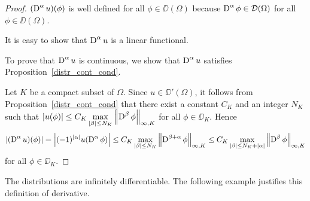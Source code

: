 \begin{proof}
 $\displaystyle (\operatorname{D}^\alpha u)(\phi)$ is well defined for all
$\phi \in \DD(\Omega)$ because $\displaystyle \operatorname{D}^\alpha \phi \in \mathcal{D}(\Omega)$
for all $\phi\in \DD(\Omega)$.

 It is easy to show that $\displaystyle \operatorname{D}^\alpha u$ is a
linear functional.

 To prove that $\displaystyle \operatorname{D}^\alpha u$ is
continuous, we show that $\displaystyle \operatorname{D}^\alpha u$ satisfies
Proposition~\ref{distr_cont_cond}.

Let $K$ be a compact subset of $\Omega$.  Since $u\in \DD'(\Omega)$,
it follows from Proposition~\ref{distr_cont_cond} that there exist a
constant $C_K$ and an integer $N_K$ such that
$\displaystyle \left| u(\phi) \right| \leq C_K \max_{|\beta|\leq N_K}
\left\| \operatorname{D}^\beta \phi \right\|_{\infty,K}$
for all $\phi \in \DD_K$.  Hence
\[
\left| (\operatorname{D}^\alpha u)(\phi) \right| =
  \left| (-1)^{|\alpha|} u(\operatorname{D}^\alpha \phi) \right|
\leq C_K \max_{|\beta|\leq N_K}
\left\| \operatorname{D}^{\beta+\alpha} \phi \right\|_{\infty,K}
\leq C_K \max_{|\beta|\leq N_K+|\alpha|}
\left\| \operatorname{D}^{\beta} \phi \right\|_{\infty,K}
\]
for all $\phi \in \DD_K$.
\end{proof}

The distributions are infinitely differentiable.  The following
example justifies this definition of derivative. 

